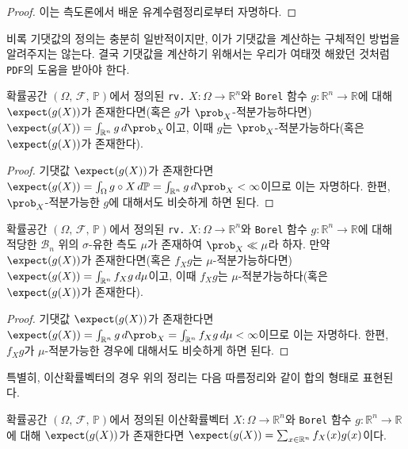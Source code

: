 \begin{proof}
    이는 측도론에서 배운 유계수렴정리로부터 자명하다.
\end{proof}

비록 기댓값의 정의는 충분히 일반적이지만, 이가 기댓값을 계산하는 구체적인 방법을 알려주지는 않는다. 결국 기댓값을 계산하기 위해서는 우리가 여태껏 해왔던 것처럼 \texttt{PDF}의 도움을 받아야 한다.

\begin{theorem}\label{thm:expectDistribution}
    확률공간 $(\Omega,\,\mathcal{F},\,\mathbb{P})$에서 정의된 \texttt{rv.} $X:\Omega\to\mathbb{R}^n$와 \texttt{Borel} 함수 $g:\mathbb{R}^n\to\mathbb{R}$에 대해 $\expect(g(X))$가 존재한다면(혹은 $g$가 $\prob_X$-적분가능하다면) $\expect(g(X))=\int_{\mathbb{R}^n}g\,d\prob_X$이고, 이때 $g$는 $\prob_X$-적분가능하다(혹은 $\expect(g(X))$가 존재한다).
\end{theorem}

\begin{proof}
    기댓값 $\expect(g(X))$가 존재한다면 $\expect(g(X))=\int_\Omega g\circ X\,d\mathbb{P}=\int_{\mathbb{R}^n}g\,d\prob_X<\infty$이므로 이는 자명하다. 한편, $\prob_X$-적분가능한 $g$에 대해서도 비슷하게 하면 된다.
\end{proof}

\begin{theorem}
    확률공간 $(\Omega,\,\mathcal{F},\,\mathbb{P})$에서 정의된 \texttt{rv.} $X:\Omega\to\mathbb{R}^n$와 \texttt{Borel} 함수 $g:\mathbb{R}^n\to\mathbb{R}$에 대해 적당한 $\mathcal{B}_n$ 위의 $\sigma$-유한 측도 $\mu$가 존재하여 $\prob_X\ll\mu$라 하자. 만약 $\expect(g(X))$가 존재한다면(혹은 $f_Xg$는 $\mu$-적분가능하다면) $\expect(g(X))=\int_{\mathbb{R}^n}f_Xg\,d\mu$이고, 이때 $f_Xg$는 $\mu$-적분가능하다(혹은 $\expect(g(X))$가 존재한다).
\end{theorem}

\begin{proof}
    기댓값 $\expect(g(X))$가 존재한다면 $\expect(g(X))=\int_{\mathbb{R}^n}g\,d\prob_X=\int_{\mathbb{R}^n}f_Xg\,d\mu<\infty$이므로 이는 자명하다. 한편, $f_Xg$가 $\mu$-적분가능한 경우에 대해서도 비슷하게 하면 된다.
\end{proof}

특별히, 이산확률벡터의 경우 위의 정리는 다음 따름정리와 같이 합의 형태로 표현된다.

\begin{corollary}
    확률공간 $(\Omega,\,\mathcal{F},\,\mathbb{P})$에서 정의된 이산확률벡터 $X:\Omega\to\mathbb{R}^n$와 \texttt{Borel} 함수 $g:\mathbb{R}^n\to\mathbb{R}$에 대해 $\expect(g(X))$가 존재한다면 $\expect(g(X))=\sum_{x\in\mathbb{R}^n}f_X(x)g(x)$이다.
\end{corollary}

